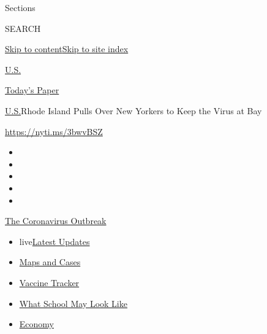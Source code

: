 Sections

SEARCH

\protect\hyperlink{site-content}{Skip to
content}\protect\hyperlink{site-index}{Skip to site index}

\href{https://www.nytimes.com/section/us}{U.S.}

\href{https://myaccount.nytimes.com/auth/login?response_type=cookie\&client_id=vi}{}

\href{https://www.nytimes.com/section/todayspaper}{Today's Paper}

\href{/section/us}{U.S.}\textbar{}Rhode Island Pulls Over New Yorkers to
Keep the Virus at Bay

\url{https://nyti.ms/3bwvBSZ}

\begin{itemize}
\item
\item
\item
\item
\item
\end{itemize}

\href{https://www.nytimes.com/news-event/coronavirus?action=click\&pgtype=Article\&state=default\&region=TOP_BANNER\&context=storylines_menu}{The
Coronavirus Outbreak}

\begin{itemize}
\tightlist
\item
  live\href{https://www.nytimes.com/2020/08/01/world/coronavirus-covid-19.html?action=click\&pgtype=Article\&state=default\&region=TOP_BANNER\&context=storylines_menu}{Latest
  Updates}
\item
  \href{https://www.nytimes.com/interactive/2020/us/coronavirus-us-cases.html?action=click\&pgtype=Article\&state=default\&region=TOP_BANNER\&context=storylines_menu}{Maps
  and Cases}
\item
  \href{https://www.nytimes.com/interactive/2020/science/coronavirus-vaccine-tracker.html?action=click\&pgtype=Article\&state=default\&region=TOP_BANNER\&context=storylines_menu}{Vaccine
  Tracker}
\item
  \href{https://www.nytimes.com/interactive/2020/07/29/us/schools-reopening-coronavirus.html?action=click\&pgtype=Article\&state=default\&region=TOP_BANNER\&context=storylines_menu}{What
  School May Look Like}
\item
  \href{https://www.nytimes.com/live/2020/07/31/business/stock-market-today-coronavirus?action=click\&pgtype=Article\&state=default\&region=TOP_BANNER\&context=storylines_menu}{Economy}
\end{itemize}

